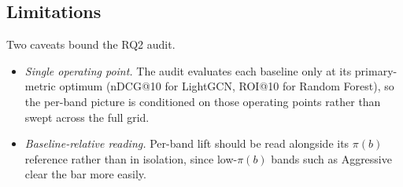 \subsection{Limitations}
\label{sec:rq2:limitations}

Two caveats bound the RQ2 audit.

\begin{itemize}
    \item \textit{Single operating point.} The audit evaluates each baseline only at its primary-metric optimum (nDCG@10 for LightGCN, ROI@10 for Random Forest), so the per-band picture is conditioned on those operating points rather than swept across the full grid.
    \item \textit{Baseline-relative reading.} Per-band lift should be read alongside its $\pi(b)$ reference rather than in isolation, since low-$\pi(b)$ bands such as Aggressive clear the bar more easily.
\end{itemize}
